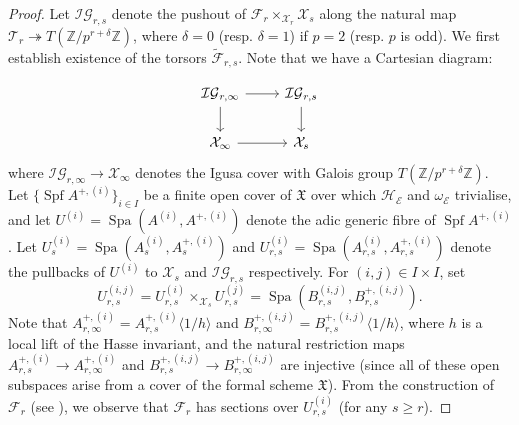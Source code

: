 \documentclass[10pt, oneside]{amsart}
\renewcommand{\tilde}{\widetilde}
\numberwithin{equation}{subsection}
\theoremstyle{definition}
\theoremstyle{remark}
\newcommand{\mbb}[1]{\mathbb{#1}}
\newcommand{\opn}[1]{\operatorname{#1}}
\begin{document}
\begin{proof}
    Let $\mathcal{IG}_{r, s}$ denote the pushout of $\mathcal{F}_{r} \times_{\mathcal{X}_r} \mathcal{X}_s$ along the natural map $\mathcal{T}_r \twoheadrightarrow T(\mbb{Z}/p^{r+\delta}\mbb{Z})$, where $\delta = 0$ (resp. $\delta = 1$) if $p=2$ (resp. $p$ is odd). We first establish existence of the torsors $\tilde{\mathcal{F}}_{r, s}$. Note that we have a Cartesian diagram:
    
    \[
\begin{tikzcd}
{\mathcal{IG}_{r, \infty}} \arrow[d] \arrow[r] & {\mathcal{IG}_{r, s}} \arrow[d] \\
\mathcal{X}_{\infty} \arrow[r]                 & \mathcal{X}_s                  
\end{tikzcd}
    \]
    where $\mathcal{IG}_{r, \infty} \to \mathcal{X}_{\infty}$ denotes the Igusa cover with Galois group $T(\mbb{Z}/p^{r+\delta}\mbb{Z})$. Let $\{ \opn{Spf}A^{+, (i)} \}_{i \in I}$ be a finite open cover of $\mathfrak{X}$ over which $\mathcal{H}_{\mathcal{E}}$ and $\omega_{\mathcal{E}}$ trivialise, and let $U^{(i)} = \opn{Spa}(A^{(i)}, A^{+, (i)})$ denote the adic generic fibre of $\opn{Spf}A^{+, (i)}$. Let $U_s^{(i)} = \opn{Spa}(A^{(i)}_{s}, A^{+,(i)}_{s})$ and $U_{r, s}^{(i)} = \opn{Spa}(A^{(i)}_{r, s}, A^{+,(i)}_{r, s})$ denote the pullbacks of $U^{(i)}$ to $\mathcal{X}_s$ and $\mathcal{IG}_{r, s}$ respectively. For $(i, j) \in I \times I$, set 
    \[
    U^{(i, j)}_{r, s} = U^{(i)}_{r, s} \times_{\mathcal{X}_s} U^{(j)}_{r, s} = \opn{Spa}(B_{r, s}^{(i, j)}, B_{r, s}^{+, (i, j)} ) .
    \]
    Note that $A^{+,(i)}_{r, \infty} = A^{+,(i)}_{r, s}\langle 1/h \rangle$ and $B_{r, \infty}^{+, (i, j)} = B_{r, s}^{+, (i, j)}\langle 1/h \rangle$, where $h$ is a local lift of the Hasse invariant, and the natural restriction maps $A^{+,(i)}_{r, s} \to A^{+,(i)}_{r, \infty}$ and $B_{r, s}^{+, (i, j)} \to B_{r, \infty}^{+, (i, j)}$ are injective (since all of these open subspaces arise from a cover of the formal scheme $\mathfrak{X}$). From the construction of $\mathcal{F}_r$ (see \cite{HaloSpectral}), we observe that $\mathcal{F}_r$ has sections over $U^{(i)}_{r, s}$ (for any $s \geq r$).


\end{proof}
\end{document}
